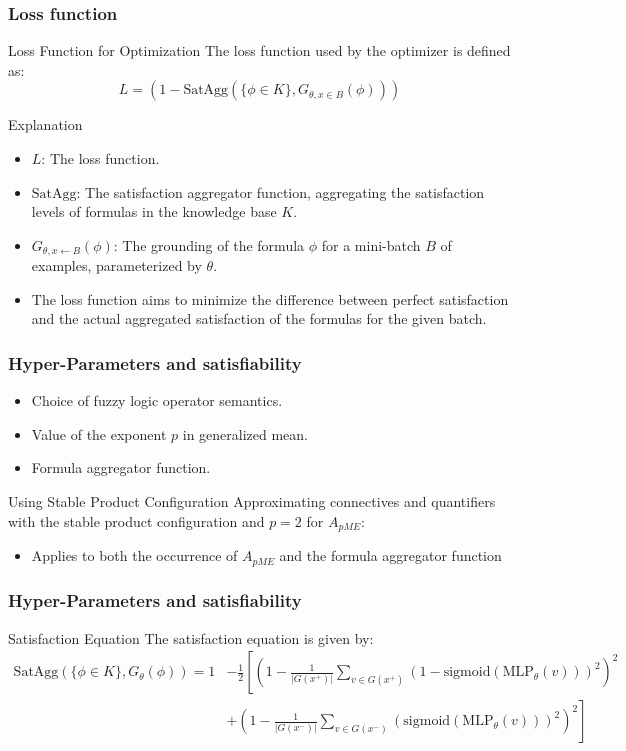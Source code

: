 \documentclass{beamer}
\begin{document}
\begin{frame}
  \frametitle{Loss function}
  \begin{block}{Loss Function for Optimization}
    The loss function used by the optimizer is defined as:
    \[ L = \left( 1 - \text{SatAgg} \left( \{\phi \in K\}, G_{\theta, x
            \in B}(\phi) \right) \right) \]
  \end{block}
  \begin{block}{Explanation}
    \begin{itemize}
    \item \(L\): The loss function.
    \item \(\text{SatAgg}\): The satisfaction aggregator function, aggregating the satisfaction levels of formulas in the knowledge base \(K\).
    \item \(G_{\theta, x \leftarrow B}(\phi)\): The grounding of the
      formula \(\phi\) for a mini-batch \(B\) of examples,
      parameterized by \(\theta\).
    \item The loss function aims to minimize the difference between
      perfect satisfaction and the actual aggregated satisfaction
      of the formulas for the given batch.
\end{itemize}
\end{block}  
\end{frame}

\begin{frame}
  \frametitle{Hyper-Parameters and satisfiability}
  \begin{itemize}
  \item Choice of fuzzy logic operator semantics.
  \item Value of the exponent \( p \) in generalized mean.
  \item Formula aggregator function.
  \end{itemize}
  \begin{block}{Using Stable Product Configuration}
    Approximating connectives and quantifiers with the stable product
    configuration and \(p = 2\) for $A_{pME}$:
    \begin{itemize}
    \item Applies to both the occurrence of $A_{pME}$ and the formula aggregator function
    \end{itemize}
  \end{block}
\end{frame}
  
\begin{frame}
  \frametitle{Hyper-Parameters and satisfiability}
\begin{block}{Satisfaction Equation}
  The satisfaction equation is given by:
  \tiny
\begin{align*}
\text{SatAgg}(\{\phi \in K\}, G_\theta(\phi)) = 1 &- \frac{1}{2} \left[ \left( 1 - \frac{1}{|G(x^+)|} \sum_{v \in G(x^+)} \left(1 - \text{sigmoid}(\text{MLP}_\theta(v))\right)^2 \right)^2 \right. \\
&+ \left. \left( 1 - \frac{1}{|G(x^-)|} \sum_{v \in G(x^-)} \left(\text{sigmoid}(\text{MLP}_\theta(v))\right)^2 \right)^2 \right]
\end{align*}
\end{block}
\end{frame}
\end{document}

